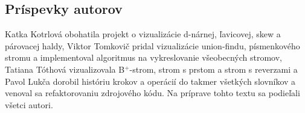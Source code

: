 \subsection{Príspevky autorov}
Katka Kotrlová obohatila projekt o vizualizácie d-nárnej, ľavicovej, skew a 
párovacej haldy, Viktor Tomkovič pridal vizualizácie union-findu, písmenkového 
stromu a implementoval algoritmus na vykreslovanie všeobecných stromov, 
Tatiana Tóthová vizualizovala B$^+$-strom, strom s prstom a strom s reverzami 
a Pavol Lukča dorobil históriu krokov a operácií do takmer všetkých slovníkov 
a venoval sa refaktorovaniu zdrojového kódu. Na príprave tohto textu sa 
podieľali všetci autori.

